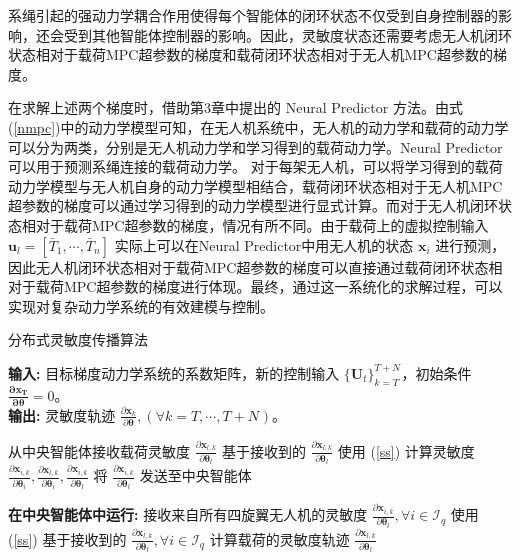 \documentclass[lang=chs, degree=master, blindreview=true, winfonts=true]{yanputhesis}
\begin{document}
系绳引起的强动力学耦合作用使得每个智能体的闭环状态不仅受到自身控制器的影响，还会受到其他智能体控制器的影响。因此，灵敏度状态还需要考虑无人机闭环状态相对于载荷MPC超参数的梯度和载荷闭环状态相对于无人机MPC超参数的梯度。

在求解上述两个梯度时，借助第3章中提出的 Neural Predictor 方法。由式(\ref{nmpc})中的动力学模型可知，在无人机系统中，无人机的动力学和载荷的动力学可以分为两类，分别是无人机动力学和学习得到的载荷动力学。Neural Predictor可以用于预测系绳连接的载荷动力学。
对于每架无人机，可以将学习得到的载荷动力学模型与无人机自身的动力学模型相结合，载荷闭环状态相对于无人机MPC超参数的梯度可以通过学习得到的动力学模型进行显式计算。而对于无人机闭环状态相对于载荷MPC超参数的梯度，情况有所不同。由于载荷上的虚拟控制输入 \( \bm{u}_l = \left[ \bar{T}_1, \cdots, \bar{T}_n \right] \) 实际上可以在Neural Predictor中用无人机的状态 \( \bm{x}_i \) 进行预测，因此无人机闭环状态相对于载荷MPC超参数的梯度可以直接通过载荷闭环状态相对于载荷MPC超参数的梯度进行体现。最终，通过这一系统化的求解过程，可以实现对复杂动力学系统的有效建模与控制。
\begin{algorithm}[h]
    \caption{分布式灵敏度传播算法}
    \label{alg:sensitivity_propagation}
    \textbf{输入:} 目标梯度动力学系统的系数矩阵，新的控制输入 $\{\bm{U}_t\}_{k=T}^{T+N_{\text{}}}$，初始条件 $\bm{\frac{\partial \bm{x}_{T}}{\partial \bm{\theta}}} = 0$。\\
    \textbf{输出:} 灵敏度轨迹 ${\frac{\partial \bm{x}_{k}}{\partial \bm{\theta}}}, (\forall k = T, \cdots, T+N_{\text{}})$。

    \begin{algorithmic}[1]
            \State 从中央智能体接收载荷灵敏度 $\frac{\partial \bm{x}_{l,k}}{\partial \bm{\theta}_l}$
            \State 基于接收到的 $\frac{\partial \bm{x}_{l,k}}{\partial \bm{\theta}_l}$ 使用 (\ref{ss}) 计算灵敏度 $\frac{\partial \bm{x}_{i,k}}{\partial \bm{\theta}_i}, \frac{\partial \bm{x}_{l,k}}{\partial \bm{\theta}_i}, \frac{\partial \bm{x}_{i,k}}{\partial \bm{\theta}_l}$
            \State 将 $\frac{\partial \bm{x}_{i,k}}{\partial \bm{\theta}_l}$ 发送至中央智能体
        \EndFor
    \EndFor
    
        \State \textbf{在中央智能体中运行:}
        \State 接收来自所有四旋翼无人机的灵敏度 $\frac{\partial \bm{x}_{i,k}}{\partial \bm{\theta}_l}, \forall i \in \mathcal{I}_q$
        \State 使用 (\ref{ss}) 基于接收到的 $\frac{\partial \bm{x}_{l,k}}{\partial \bm{\theta}_l}, \forall i \in \mathcal{I}_q$ 计算载荷的灵敏度轨迹 $\frac{\partial \bm{x}_{l,k}}{\partial \bm{\theta}_l}$
    \EndFor
    \end{algorithmic}
\end{algorithm}
\end{document}
